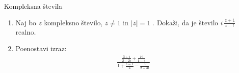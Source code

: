 \begin{frame}{Kompleksna števila}
	\begin{enumerate}
		\item
		Naj bo $z$ kompleksno število, $z \ne 1$ in $|z|=1$  .
		Dokaži, da je število \( i \, \frac{z+1}{z-1} \) realno.
		\item
		Poenostavi izraz:
		\large
		\begin{align*}
		\frac{\frac{3+i}{2-2i}+\frac{7i}{1-i}}{1+\frac{i-1}{4}-\frac{5}{2-3i}}
		\end{align*}
	\end{enumerate}
\end{frame}
